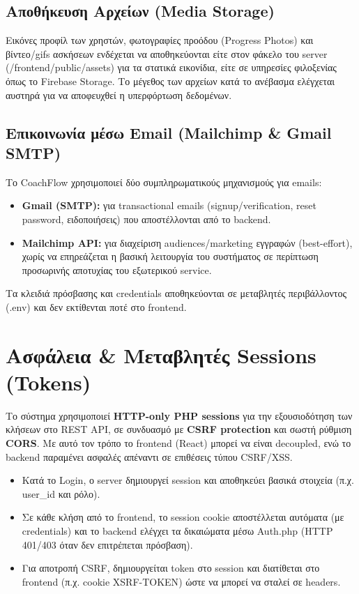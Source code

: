\documentclass[12pt,a4paper]{report}
\begin{document}
\subsection{Αποθήκευση Αρχείων (Media Storage)}
Εικόνες προφίλ των χρηστών, φωτογραφίες προόδου (Progress Photos) και βίντεο/gifs ασκήσεων ενδέχεται να αποθηκεύονται είτε στον φάκελο του server (\textenglish{/frontend/public/assets}) για τα στατικά εικονίδια, είτε σε υπηρεσίες φιλοξενίας όπως το Firebase Storage. Το μέγεθος των αρχείων κατά το ανέβασμα ελέγχεται αυστηρά για να αποφευχθεί η υπερφόρτωση δεδομένων.

\subsection{Επικοινωνία μέσω Email (Mailchimp \& Gmail SMTP)}
Το CoachFlow χρησιμοποιεί δύο συμπληρωματικούς μηχανισμούς για emails:
\begin{itemize}[label=•]
    \item \textbf{Gmail (SMTP):} για transactional emails (signup/verification, reset password, ειδοποιήσεις) που αποστέλλονται από το backend.
    \item \textbf{Mailchimp API:} για διαχείριση audiences/marketing εγγραφών (best-effort), χωρίς να επηρεάζεται η βασική λειτουργία του συστήματος σε περίπτωση προσωρινής αποτυχίας του εξωτερικού service.
\end{itemize}
Τα κλειδιά πρόσβασης και credentials αποθηκεύονται σε μεταβλητές περιβάλλοντος (\textenglish{.env}) και δεν εκτίθενται ποτέ στο frontend.

\newpage

\section{Ασφάλεια \& Μεταβλητές Sessions (Tokens)}
Το σύστημα χρησιμοποιεί \textbf{HTTP-only PHP sessions} για την εξουσιοδότηση των κλήσεων στο REST API, σε συνδυασμό με \textbf{CSRF protection} και σωστή ρύθμιση \textbf{CORS}. Με αυτό τον τρόπο το frontend (React) μπορεί να είναι decoupled, ενώ το backend παραμένει ασφαλές απέναντι σε επιθέσεις τύπου CSRF/XSS.

\begin{itemize}[label=•]
    \item Κατά το \textenglish{Login}, ο server δημιουργεί session και αποθηκεύει βασικά στοιχεία (π.χ. \textenglish{user\_id} και ρόλο).
    \item Σε κάθε κλήση από το frontend, το session cookie αποστέλλεται αυτόματα (με \textenglish{credentials}) και το backend ελέγχει τα δικαιώματα μέσω \textenglish{Auth.php} (\textenglish{HTTP 401/403} όταν δεν επιτρέπεται πρόσβαση).
    \item Για αποτροπή CSRF, δημιουργείται token στο session και διατίθεται στο frontend (π.χ. cookie \textenglish{XSRF-TOKEN}) ώστε να μπορεί να σταλεί σε headers.
\end{itemize}
\end{document}
